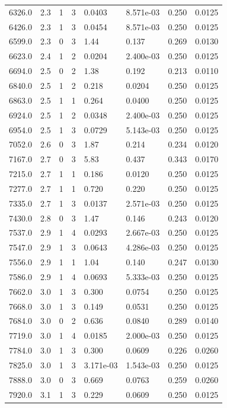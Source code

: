 \documentclass[preview]{standalone}
\begin{document}
{{{{\begin{tabular}{L{1.2cm}C{1.2cm} C{0.3cm}C{0.5cm} C{1.4cm}C{1.4cm} C{1.4cm}C{1.4cm}}
  6326.0  &   2.3  & 1     &  3 &  0.0403  & 8.571e-03  & 0.250 &  0.0125   \\ 
  6426.0  &   2.3  & 1     &  3 &  0.0454  & 8.571e-03  & 0.250 &  0.0125   \\ 
  6599.0  &   2.3  & 0     &  3 &  1.44  & 0.137  & 0.269 &  0.0130   \\ 
  6623.0  &   2.4  & 1     &  2 &  0.0204  & 2.400e-03  & 0.250 &  0.0125   \\ 
  6694.0  &   2.5  & 0     &  2 &  1.38  & 0.192  & 0.213 &  0.0110   \\ 
  6840.0  &   2.5  & 1     &  2 &  0.218  & 0.0204  & 0.250 &  0.0125   \\ 
  6863.0  &   2.5  & 1     &  1 &  0.264  & 0.0400  & 0.250 &  0.0125   \\ 
  6924.0  &   2.5  & 1     &  2 &  0.0348  & 2.400e-03  & 0.250 &  0.0125   \\ 
  6954.0  &   2.5  & 1     &  3 &  0.0729  & 5.143e-03  & 0.250 &  0.0125   \\ 
  7052.0  &   2.6  & 0     &  3 &  1.87  & 0.214  & 0.234 &  0.0120   \\ 
  7167.0  &   2.7  & 0     &  3 &  5.83  & 0.437  & 0.343 &  0.0170   \\ 
  7215.0  &   2.7  & 1     &  1 &  0.186  & 0.0120  & 0.250 &  0.0125   \\ 
  7277.0  &   2.7  & 1     &  1 &  0.720  & 0.220  & 0.250 &  0.0125   \\ 
  7335.0  &   2.7  & 1     &  3 &  0.0137  & 2.571e-03  & 0.250 &  0.0125   \\ 
  7430.0  &   2.8  & 0     &  3 &  1.47  & 0.146  & 0.243 &  0.0120   \\ 
  7537.0  &   2.9  & 1     &  4 &  0.0293  & 2.667e-03  & 0.250 &  0.0125   \\ 
  7547.0  &   2.9  & 1     &  3 &  0.0643  & 4.286e-03  & 0.250 &  0.0125   \\ 
  7556.0  &   2.9  & 1     &  1 &  1.04  & 0.140  & 0.247 &  0.0130   \\ 
  7586.0  &   2.9  & 1     &  4 &  0.0693  & 5.333e-03  & 0.250 &  0.0125   \\ 
  7662.0  &   3.0  & 1     &  3 &  0.300  & 0.0754  & 0.250 &  0.0125   \\ 
  7668.0  &   3.0  & 1     &  3 &  0.149  & 0.0531  & 0.250 &  0.0125   \\ 
  7684.0  &   3.0  & 0     &  2 &  0.636  & 0.0840  & 0.289 &  0.0140   \\ 
  7719.0  &   3.0  & 1     &  4 &  0.0185  & 2.000e-03  & 0.250 &  0.0125   \\ 
  7784.0  &   3.0  & 1     &  3 &  0.300  & 0.0609  & 0.226 &  0.0260   \\ 
  7825.0  &   3.0  & 1     &  3 &  3.171e-03  & 1.543e-03  & 0.250 &  0.0125   \\ 
  7888.0  &   3.0  & 0     &  3 &  0.669  & 0.0763  & 0.259 &  0.0260   \\ 
  7920.0  &   3.1  & 1     &  3 &  0.229  & 0.0609  & 0.250 &  0.0125   \\ 
\hline 
\end{tabular} 

}}}}
\end{document}
